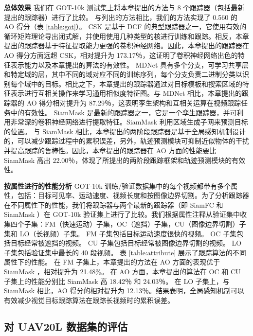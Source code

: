 \textbf{总体效果}
我们在 GOT-10k 测试集上将本章提出的方法与 8 个跟踪器（包括最新提出的跟踪器）进行了比较。
与列出的方法相比，我们的方法实现了 0.560 的 AO 得分（表 \ref{table:got}）。
CSK 是基于 DCF 的典型跟踪器之一，它使用有效的循环矩阵理论导出闭式解，并使用使用几种类型的核进行训练和跟踪。相反，本章提出的跟踪器基于特征提取能力更强的卷积神经网络。因此，本章提出的跟踪器在 AO 得分方面远超 CSK，相对提升为 173.17％，这证明了卷积神经网络出色的特征表示能力以及本章提出的算法的有效性。
MDNet 具有多个分支，可学习共享层和特定域的层，其中不同的域对应不同的训练序列，每个分支负责二进制分类以识别每个域中的目标。相比之下，本章提出的跟踪器通过对目标模板和搜索区域的特征表示进行互相关操作来学习通用相似度特征图。与 MDNet 相比，本章提出的跟踪器的 AO 得分相对提升为 87.29％，这表明孪生架构和互相关运算在视频跟踪任务中的有效性。
SiamMask 是最新的跟踪器之一，它是一个孪生跟踪器，并可利用非常深的卷积神经网络进行提取特征。SiamMask 利用区域生成子网来预测目标的位置。
与 SiamMask \cite{Wang2018SiamMask} 相比，本章提出的两阶段跟踪器是基于全局感知机制设计的，可以减少跟踪过程中的累积误差，另外，轨迹预测模块可抑制近似物体的干扰并提高跟踪的鲁棒性。因此，本章提出的跟踪器在 AO 方面的性能要比 SiamMask 高出 22.00％，体现了所提出的两阶段跟踪框架和轨迹预测模块的有效性。

\textbf{按属性进行的性能分析}
GOT-10k 训练/验证数据集中的每个视频都带有多个属性，包括：目标可见率、运动速度、视频长度和按图像边界切割。为了分析跟踪器在不同属性下的性能，我们将跟踪器与两个最新的跟踪器（即 SiamFC  \cite{SiamFC} 和 SiamMask \cite{Wang2018SiamMask}）在 GOT-10k 验证集上进行了比较。我们根据属性注释从验证集中收集四个子集：FM（快速运动）子集，OC（遮挡）子集，CU（图像边界切割）子集和 LO（长视频）子集。
FM 子集包括目标运动速度很快的视频。
OC 子集包括目标经常被遮挡的视频。
CU 子集包括目标经常被图像边界切割的视频。
LO 子集包括验证集中最长的 40 段视频。
表 \ref{table:attribute} 展示了跟踪算法的不同属性下的性能。
在 FM 子集上，本章提出的方法在 AO 方面的表现优于 SiamMask \cite{Wang2018SiamMask}，相对提升为 21.48\%。
在 AO 方面，本章提出的算法在 OC 和 CU 子集上的性能分别比 SiamMask 高 18.42％ 和 24.03％。
在 LO 子集上，与 SiamMask 相比，AO 得分的相对提升为 12.13％。结果表明，全局感知机制可以有效减少视觉目标跟踪算法在跟踪长视频时的累积误差。

\subsection{对 UAV20L 数据集的评估}

